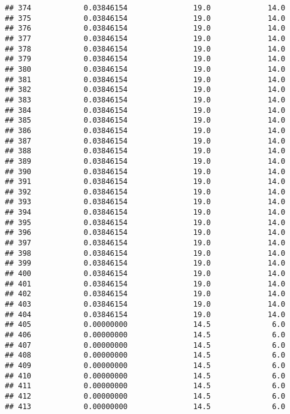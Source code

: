 \documentclass[]{article}
\begin{document}
\begin{verbatim}
## 374            0.03846154               19.0             14.0
## 375            0.03846154               19.0             14.0
## 376            0.03846154               19.0             14.0
## 377            0.03846154               19.0             14.0
## 378            0.03846154               19.0             14.0
## 379            0.03846154               19.0             14.0
## 380            0.03846154               19.0             14.0
## 381            0.03846154               19.0             14.0
## 382            0.03846154               19.0             14.0
## 383            0.03846154               19.0             14.0
## 384            0.03846154               19.0             14.0
## 385            0.03846154               19.0             14.0
## 386            0.03846154               19.0             14.0
## 387            0.03846154               19.0             14.0
## 388            0.03846154               19.0             14.0
## 389            0.03846154               19.0             14.0
## 390            0.03846154               19.0             14.0
## 391            0.03846154               19.0             14.0
## 392            0.03846154               19.0             14.0
## 393            0.03846154               19.0             14.0
## 394            0.03846154               19.0             14.0
## 395            0.03846154               19.0             14.0
## 396            0.03846154               19.0             14.0
## 397            0.03846154               19.0             14.0
## 398            0.03846154               19.0             14.0
## 399            0.03846154               19.0             14.0
## 400            0.03846154               19.0             14.0
## 401            0.03846154               19.0             14.0
## 402            0.03846154               19.0             14.0
## 403            0.03846154               19.0             14.0
## 404            0.03846154               19.0             14.0
## 405            0.00000000               14.5              6.0
## 406            0.00000000               14.5              6.0
## 407            0.00000000               14.5              6.0
## 408            0.00000000               14.5              6.0
## 409            0.00000000               14.5              6.0
## 410            0.00000000               14.5              6.0
## 411            0.00000000               14.5              6.0
## 412            0.00000000               14.5              6.0
## 413            0.00000000               14.5              6.0

\end{verbatim}
\end{document}
